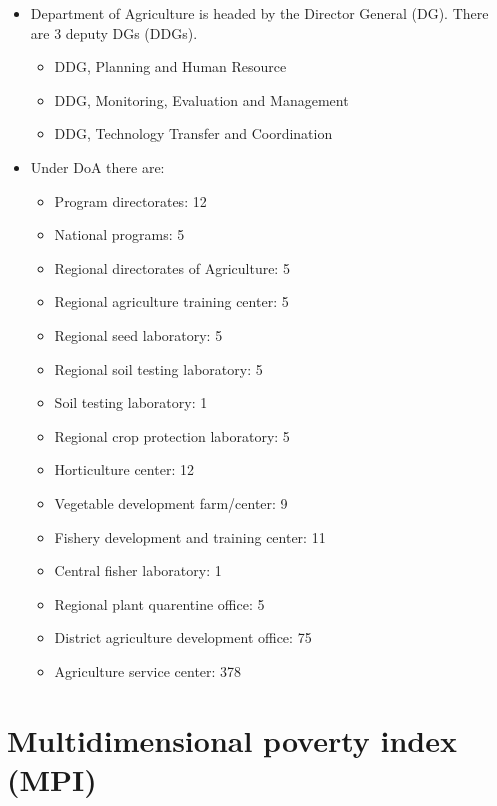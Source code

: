\documentclass[
]{book}
\providecommand{\tightlist}{%
  \setlength{\itemsep}{0pt}\setlength{\parskip}{0pt}}
\begin{document}
\begin{itemize}
\tightlist
\item
  Department of Agriculture is headed by the Director General (DG). There are 3 deputy DGs (DDGs).

  \begin{itemize}
  \tightlist
  \item
    DDG, Planning and Human Resource
  \item
    DDG, Monitoring, Evaluation and Management
  \item
    DDG, Technology Transfer and Coordination
  \end{itemize}
\item
  Under DoA there are:

  \begin{itemize}
  \tightlist
  \item
    Program directorates: 12
  \item
    National programs: 5
  \item
    Regional directorates of Agriculture: 5
  \item
    Regional agriculture training center: 5
  \item
    Regional seed laboratory: 5
  \item
    Regional soil testing laboratory: 5
  \item
    Soil testing laboratory: 1
  \item
    Regional crop protection laboratory: 5
  \item
    Horticulture center: 12
  \item
    Vegetable development farm/center: 9
  \item
    Fishery development and training center: 11
  \item
    Central fisher laboratory: 1
  \item
    Regional plant quarentine office: 5
  \item
    District agriculture development office: 75
  \item
    Agriculture service center: 378
  \end{itemize}
\end{itemize}

\hypertarget{multidimensional-poverty-index-mpi}{%
\section{Multidimensional poverty index (MPI)}\label{multidimensional-poverty-index-mpi}}
\end{document}
